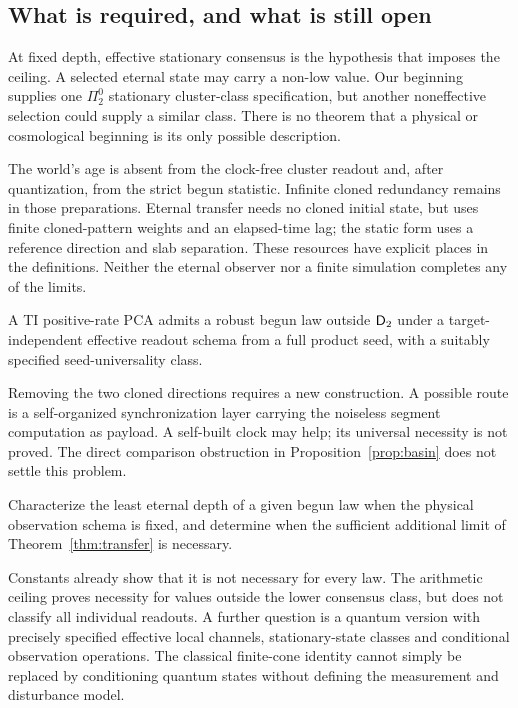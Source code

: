 \subsection{What is required, and what is still open}
At fixed depth, effective stationary consensus is the hypothesis
that imposes the ceiling. A selected eternal state may carry a
non-low value. Our beginning supplies one $\Pi^0_2$ stationary
cluster-class specification, but another noneffective selection
could supply a similar class. There is no theorem that a physical
or cosmological beginning is its only possible description.

The world's age is absent from the clock-free cluster readout and,
after quantization, from the strict begun statistic. Infinite
cloned redundancy remains in those preparations. Eternal transfer
needs no cloned initial state, but uses finite cloned-pattern
weights and an elapsed-time lag; the static form uses a reference
direction and slab separation. These resources have explicit
places in the definitions. Neither the eternal observer nor a
finite simulation completes any of the limits.

\begin{conjecture}
A TI positive-rate PCA admits a robust begun law outside $\mathsf D_2$
under a target-independent effective readout schema from a full
product seed, with a suitably specified seed-universality class.
\end{conjecture}
Removing the two cloned directions requires a new construction.
A possible route is a self-organized synchronization layer carrying
the noiseless segment computation as payload. A self-built clock
may help; its universal necessity is not proved. The direct
comparison obstruction in Proposition~\ref{prop:basin} does not
settle this problem.

\begin{conjecture}
Characterize the least eternal depth of a given begun law when
the physical observation schema is fixed, and determine when
the sufficient additional limit of Theorem~\ref{thm:transfer}
is necessary.
\end{conjecture}
Constants already show that it is not necessary for every law.
The arithmetic ceiling proves necessity for values outside the
lower consensus class, but does not classify all individual
readouts. A further question is a quantum version with precisely
specified effective local channels, stationary-state classes and
conditional observation operations. The classical finite-cone
identity cannot simply be replaced by conditioning quantum
states without defining the measurement and disturbance model.

